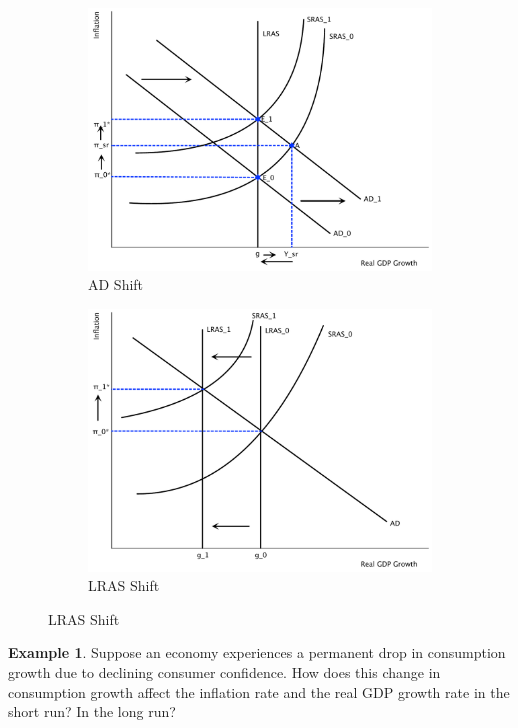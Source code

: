 \documentclass[11pt]{article}\usepackage[]{graphicx}\usepackage[]{color}
\theoremstyle{definition}
\newtheorem{exmp}{Example}[section]
\begin{document}
	\begin{figure}[H]
		\centering
		\caption{AS-AD Shocks}
		\begin{subfigure}{.5\textwidth}
				\includegraphics[scale=.40]{plot99.pdf}
			\caption{AD Shift}
		\end{subfigure}%
		\begin{subfigure}{.5\textwidth}
			\centering
			\includegraphics[scale=.40]{plot100.pdf}
			\caption{LRAS Shift}
		\end{subfigure}
	\end{figure}
	


\begin{exmp}
Suppose an economy experiences a permanent drop in consumption growth due to declining consumer confidence. How does this change in consumption growth affect the inflation rate and the real GDP growth rate in the short run? In the long run?
\end{exmp}
\end{document}
